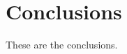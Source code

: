 \graphicspath{{main-matter/conclusions/resources/}}

\chapter{Conclusions}\label{chap_conc}

These are the conclusions.